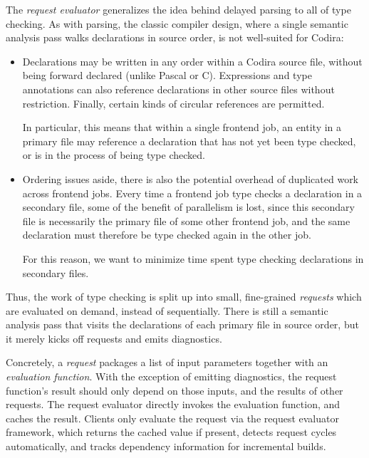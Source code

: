 \documentclass[../generics]{subfiles}
\begin{document}
The \emph{request evaluator} generalizes the idea behind delayed parsing to all of type checking. As with parsing, the classic compiler design, where a single semantic analysis pass walks declarations in source order, is not well-suited for Codira:
\begin{itemize}
\item Declarations may be written in any order within a Codira source file, without being forward declared (unlike Pascal or C). Expressions and type annotations can also reference declarations in other source files without restriction. Finally, certain kinds of circular references are permitted.

In particular, this means that within a single frontend job, an entity in a primary file may reference a declaration that has not yet been type checked, or is in the process of being type checked.

\item Ordering issues aside, there is also the potential overhead of duplicated work across frontend jobs. Every time a frontend job type checks a declaration in a secondary file, some of the benefit of parallelism is lost, since this secondary file is necessarily the primary file of some other frontend job, and the same declaration must therefore be type checked again in the other job.

For this reason, we want to minimize time spent type checking declarations in secondary files.
\end{itemize}

Thus, the work of type checking is split up into small, fine-grained \emph{requests} which are evaluated on demand, instead of sequentially. There is still a semantic analysis pass that visits the declarations of each primary file in source order, but it merely kicks off requests and emits diagnostics.

Concretely, a \emph{request} packages a list of input parameters together with an \emph{evaluation function}. With the exception of emitting diagnostics, the request function's result should only depend on those inputs, and the results of other requests. The request evaluator directly invokes the evaluation function, and caches the result. Clients only evaluate the request via the request evaluator framework, which returns the cached value if present, detects request cycles automatically, and tracks dependency information for incremental builds.
\end{document}
